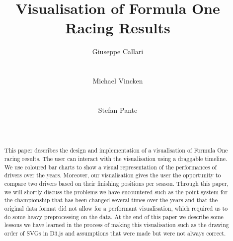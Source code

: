 \documentclass{sigchi}
\begin{document}
\title{Visualisation of Formula One Racing Results}

\author{
  \alignauthor Giuseppe Callari\\
    \\
    \\
  \alignauthor Michael Vincken\\
    \\
    \\
  \alignauthor Stefan Pante\\
    \\
    \\
}

\maketitle

\begin{abstract}
This paper describes the design and implementation of a visualisation of Formula One racing results. The user can interact with the visualisation using a draggable timeline. We use coloured bar charts to show a visual representation of the performances of drivers over the years. Moreover, our visualisation gives the user the opportunity to compare two drivers based on their finishing positions per season. Through this paper, we will shortly discuss the problems we have encountered such as the point system for the championship that has been changed several times over the years and that the original data format did not allow for a performant visualisation, which required us to do some heavy preprocessing on the data. At the end of this paper we describe some lessons we have learned in the process of making this visualisation such as the drawing order of SVGs in D3.js and assumptions that were made but were not always correct.

\end{abstract}


\end{document}
